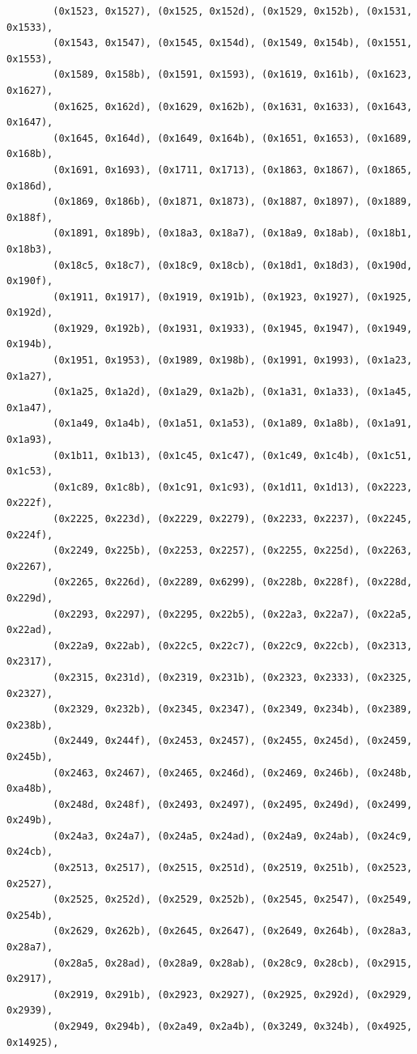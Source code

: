 \documentclass[11pt,a4paper]{article}
\begin{document}
\begin{lstlisting}
        (0x1523, 0x1527), (0x1525, 0x152d), (0x1529, 0x152b), (0x1531, 0x1533),
        (0x1543, 0x1547), (0x1545, 0x154d), (0x1549, 0x154b), (0x1551, 0x1553),
        (0x1589, 0x158b), (0x1591, 0x1593), (0x1619, 0x161b), (0x1623, 0x1627),
        (0x1625, 0x162d), (0x1629, 0x162b), (0x1631, 0x1633), (0x1643, 0x1647),
        (0x1645, 0x164d), (0x1649, 0x164b), (0x1651, 0x1653), (0x1689, 0x168b),
        (0x1691, 0x1693), (0x1711, 0x1713), (0x1863, 0x1867), (0x1865, 0x186d),
        (0x1869, 0x186b), (0x1871, 0x1873), (0x1887, 0x1897), (0x1889, 0x188f),
        (0x1891, 0x189b), (0x18a3, 0x18a7), (0x18a9, 0x18ab), (0x18b1, 0x18b3),
        (0x18c5, 0x18c7), (0x18c9, 0x18cb), (0x18d1, 0x18d3), (0x190d, 0x190f),
        (0x1911, 0x1917), (0x1919, 0x191b), (0x1923, 0x1927), (0x1925, 0x192d),
        (0x1929, 0x192b), (0x1931, 0x1933), (0x1945, 0x1947), (0x1949, 0x194b),
        (0x1951, 0x1953), (0x1989, 0x198b), (0x1991, 0x1993), (0x1a23, 0x1a27),
        (0x1a25, 0x1a2d), (0x1a29, 0x1a2b), (0x1a31, 0x1a33), (0x1a45, 0x1a47),
        (0x1a49, 0x1a4b), (0x1a51, 0x1a53), (0x1a89, 0x1a8b), (0x1a91, 0x1a93),
        (0x1b11, 0x1b13), (0x1c45, 0x1c47), (0x1c49, 0x1c4b), (0x1c51, 0x1c53),
        (0x1c89, 0x1c8b), (0x1c91, 0x1c93), (0x1d11, 0x1d13), (0x2223, 0x222f),
        (0x2225, 0x223d), (0x2229, 0x2279), (0x2233, 0x2237), (0x2245, 0x224f),
        (0x2249, 0x225b), (0x2253, 0x2257), (0x2255, 0x225d), (0x2263, 0x2267),
        (0x2265, 0x226d), (0x2289, 0x6299), (0x228b, 0x228f), (0x228d, 0x229d),
        (0x2293, 0x2297), (0x2295, 0x22b5), (0x22a3, 0x22a7), (0x22a5, 0x22ad),
        (0x22a9, 0x22ab), (0x22c5, 0x22c7), (0x22c9, 0x22cb), (0x2313, 0x2317),
        (0x2315, 0x231d), (0x2319, 0x231b), (0x2323, 0x2333), (0x2325, 0x2327),
        (0x2329, 0x232b), (0x2345, 0x2347), (0x2349, 0x234b), (0x2389, 0x238b),
        (0x2449, 0x244f), (0x2453, 0x2457), (0x2455, 0x245d), (0x2459, 0x245b),
        (0x2463, 0x2467), (0x2465, 0x246d), (0x2469, 0x246b), (0x248b, 0xa48b),
        (0x248d, 0x248f), (0x2493, 0x2497), (0x2495, 0x249d), (0x2499, 0x249b),
        (0x24a3, 0x24a7), (0x24a5, 0x24ad), (0x24a9, 0x24ab), (0x24c9, 0x24cb),
        (0x2513, 0x2517), (0x2515, 0x251d), (0x2519, 0x251b), (0x2523, 0x2527),
        (0x2525, 0x252d), (0x2529, 0x252b), (0x2545, 0x2547), (0x2549, 0x254b),
        (0x2629, 0x262b), (0x2645, 0x2647), (0x2649, 0x264b), (0x28a3, 0x28a7),
        (0x28a5, 0x28ad), (0x28a9, 0x28ab), (0x28c9, 0x28cb), (0x2915, 0x2917),
        (0x2919, 0x291b), (0x2923, 0x2927), (0x2925, 0x292d), (0x2929, 0x2939),
        (0x2949, 0x294b), (0x2a49, 0x2a4b), (0x3249, 0x324b), (0x4925, 0x14925),

\end{lstlisting}
\end{document}
